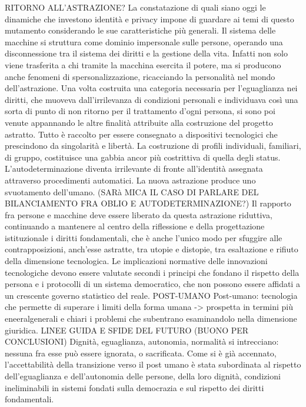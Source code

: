 RITORNO ALL’ASTRAZIONE?
La constatazione di quali siano oggi le dinamiche che investono identità e privacy impone di guardare ai temi di questo mutamento considerando le sue caratteristiche più generali.
Il sistema delle macchine si struttura come dominio impersonale sulle persone, operando una disconnessione tra il sistema dei diritti e la gestione della vita. Infatti non solo viene trasferita a chi tramite la macchina esercita il potere, ma si producono anche fenomeni di spersonalizzazione, ricacciando la personalità nel mondo dell’astrazione.
Una volta costruita una categoria necessaria per l’eguaglianza nei diritti, che muoveva dall’irrilevanza di condizioni personali e individuava così una sorta di punto di non ritorno per il trattamento d’ogni persona, si sono poi venute appannando le altre finalità attribuite alla costruzione del progetto astratto.
Tutto è raccolto per essere consegnato a dispositivi tecnologici che prescindono da singolarità e libertà. La costruzione di profili individuali, familiari, di gruppo, costituisce una gabbia ancor più costrittiva di quella degli status. L’autodeterminazione diventa irrilevante di fronte all’identità assegnata attraverso procedimenti automatici. La nuova astrazione produce uno svuotamento dell’umano.
(SARà MICA IL CASO DI PARLARE DEL BILANCIAMENTO FRA OBLIO E AUTODETERMINAZIONE?)
Il rapporto fra persone e macchine deve essere liberato da questa astrazione riduttiva, continuando a mantenere al centro della riflessione e della progettazione istituzionale i diritti fondamentali, che è anche l’unico modo per sfuggire alle contrapposizioni, anch’esse astratte, tra utopie e distopie, tra esaltazione e rifiuto della dimensione tecnologica. Le implicazioni normative delle innovazioni tecnologiche devono essere valutate secondi i principi che fondano il rispetto della persona e i protocolli di un sistema democratico, che non possono essere affidati a un crescente governo statistico del reale.
POST-UMANO
Post-umano: tecnologia che permette di superare i limiti della forma umana -> prospetta in termini più eneeralgenerali e chiari i problemi che subentrano esaminandolo nella dimensione giuridica.
LINEE GUIDA E SFIDE DEL FUTURO (BUONO PER CONCLUSIONI)
Dignità, eguaglianza, autonomia, normalità si intrecciano: nessuna fra esse può essere ignorata, o sacrificata. Come si è già accennato, l’accettabilità della transizione verso il post umano è stata subordinata al rispetto dell’eguaglianza e dell’autonomia delle persone, della loro dignità, condizioni ineliminabili in sistemi fondati sulla democrazia e sul rispetto dei diritti fondamentali.







